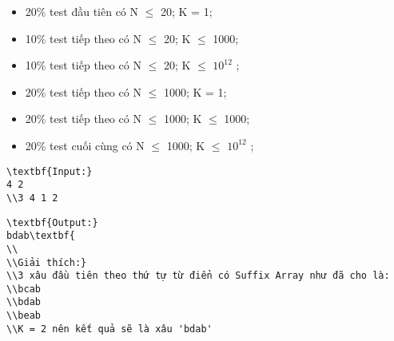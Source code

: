\begin{itemize}
	\item     20\% test đầu tiên có N  $\le$  20; K = 1;   
	\item     10\% test tiếp theo có N  $\le$  20; K  $\le$  1000;   
	\item     10\% test tiếp theo có N  $\le$  20; K  $\le$  $10^{12}$    ;   
	\item     20\% test tiếp theo có N  $\le$  1000; K = 1;   
	\item     20\% test tiếp theo có N  $\le$  1000; K  $\le$ 1000;   
	\item     20\% test cuối cùng có N  $\le$  1000; K  $\le$  $10^{12}$    ;   
\end{itemize}
\begin{verbatim}
\textbf{Input:}
4 2
\\3 4 1 2\end{verbatim}
\begin{verbatim}
\textbf{Output:}
bdab\textbf{
\\
\\Giải thích:}
\\3 xâu đầu tiên theo thứ tự từ điển có Suffix Array như đã cho là:
\\bcab
\\bdab
\\beab
\\K = 2 nên kết quả sẽ là xâu 'bdab' \end{verbatim}